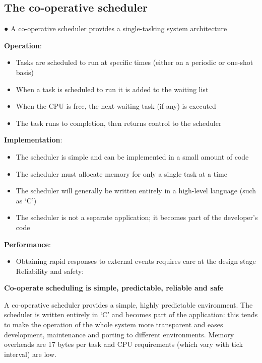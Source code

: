 \subsection{The co-operative scheduler}

● A co-operative scheduler provides a single-tasking system architecture

\textbf{Operation}:
\begin{itemize}
    \item Tasks are scheduled to run at specific times (either on a periodic or one-shot basis)
\item When a task is scheduled to run it is added to the waiting list
\item When the CPU is free, the next waiting task (if any) is executed
\item The task runs to completion, then returns control to the scheduler
\end{itemize}


\textbf{Implementation}:
\begin{itemize}
    \item The scheduler is simple and can be implemented in a small amount of code
    \item The scheduler must allocate memory for only a single task at a time
    \item The scheduler will generally be written entirely in a high-level language (such as ‘C’)
   \item The scheduler is not a separate application; it becomes part of the developer’s code
\end{itemize}


\textbf{Performance}:
\begin{itemize}
    \item Obtaining rapid responses to external events requires care at the design stage
Reliability and safety:

\end{itemize}

\textbf{Co-operate scheduling is simple, predictable, reliable and safe}

A co-operative scheduler provides a simple, highly predictable environment. The
scheduler is written entirely in ‘C’ and becomes part of the application: this tends to
make the operation of the whole system more transparent and eases development,
maintenance and porting to different environments. Memory overheads are 17
bytes per task and CPU requirements (which vary with tick interval) are low.

